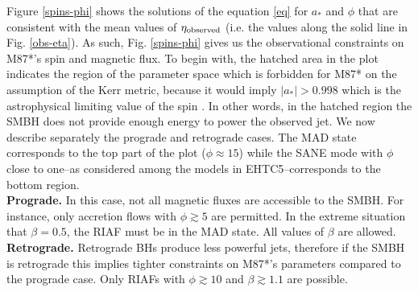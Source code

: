 \documentclass[twocolumn]{aastex62} %
\begin{document}
Figure \ref{spins-phi} shows the solutions of the equation \ref{eq} for $a_*$ and $\phi$ that are consistent with the mean values of $\eta_{\rm observed}$ (i.e. the values along the solid line in Fig. \ref{obs-eta}). %
As such, Fig. \ref{spins-phi} gives us the observational constraints on M87*'s spin and magnetic flux. To begin with, the hatched area in the plot indicates the region of the parameter space which is forbidden for M87* on the assumption of the Kerr metric, because it would imply $|a_*| > 0.998$ which is the astrophysical limiting value of the spin \citep{Thorne1974}. In other words, in the hatched region the SMBH does not provide enough energy to power the observed jet. We now describe separately the prograde and retrograde cases. The MAD state corresponds to the top part of the plot ($\phi \approx 15$) while the SANE mode with $\phi$ close to one--as considered among the models in EHTC5--corresponds to the bottom region. \\
%
\textbf{Prograde.} In this case, not all magnetic fluxes are accessible to the SMBH. For instance, only accretion flows with $\phi \gtrsim 5$ are permitted. In the extreme situation that $\beta=0.5$, the RIAF must be in the MAD state. All values of $\beta$ are allowed. \\
\textbf{Retrograde.} Retrograde BHs produce less powerful jets, therefore if the SMBH is retrograde this implies tighter constraints on M87*'s parameters compared to the prograde case. Only RIAFs with  $\phi \gtrsim 10$ and $\beta \gtrsim 1.1$ are possible.  \\
\end{document}
